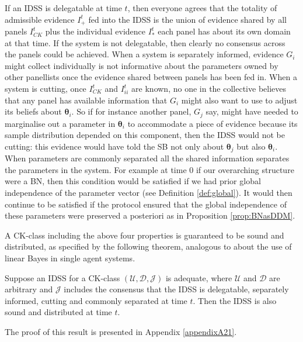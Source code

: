 If an IDSS is delegatable at time $t$, then everyone agrees that the totality of admissible evidence $ I_{+}^{t} $ fed into the IDSS is the union of evidence shared by all panels $I_{CK}^{t}$ plus the individual evidence $I_{\ast }^{t}$ each panel has about its own domain at that time. If the system is not delegatable, then clearly no consensus across the panels could be achieved.  When a system is separately informed,  evidence $G_{i} $ might collect individually is not informative about the  parameters  owned by other panellists once the evidence shared between panels has been fed in. When a system is cutting, once $I_{CK}^t$ and $I_{ii}^{t} $ are known, no one in the collective believes that any panel has available information that $G_{i}$ might also want to use to adjust its beliefs about $\bm{\theta}_{i}$. So if for instance another panel, $G_j$ say, might  have needed to marginalise out a parameter in $\bm{\theta }_{i}$   to accommodate a piece of evidence because its sample distribution depended on this component, then the IDSS would not be cutting: this evidence would have told the SB not only about $\bm{\theta }_{j}$ but  also $\bm{\theta }_{i}$. When parameters are commonly separated all the shared information separates the parameters in the system. For example at time $0$ if our overarching structure were a BN, then this condition would be satisfied if we had prior global independence of the parameter vector (see Definition \ref{def:global}). It would then continue to be satisfied if the protocol ensured that the global independence of these parameters were preserved a posteriori as in Proposition \ref{prop:BNasDDM}.

A CK-class including the above four properties is guaranteed to be sound and distributed, as specified by the following theorem, analogous to \citet{Goldstein96} about the use of linear Bayes in single agent systems.
\begin{theorem}
\label{theo:gold}
Suppose an IDSS for a CK-class $\left( \mathcal{U},\bm{\mathcal{D}},\mathcal{J}\right) $ is adequate, where $\mathcal{U}$ and $\bm{\mathcal{D}}$ are arbitrary and $\mathcal{J}$ includes the consensus that the IDSS is delegatable, separately informed, cutting and commonly separated at time $t$. Then the IDSS is also  sound and distributed at time $t$.
\end{theorem}
The proof of this result is presented in Appendix \ref{appendixA21}.

